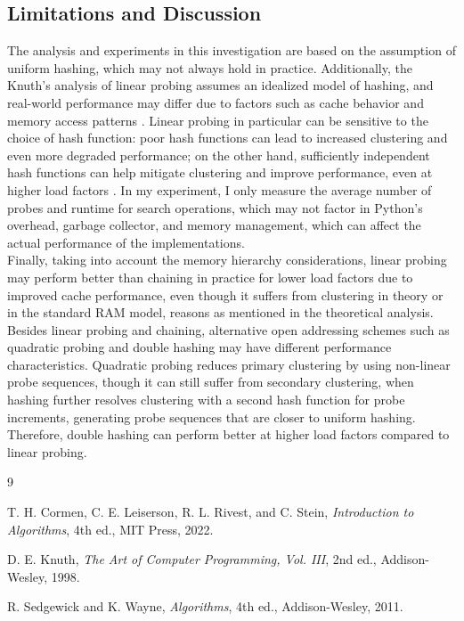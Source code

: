 \documentclass[12pt, a4paper]{article}
\begin{document}
\subsection*{Limitations and Discussion}
The analysis and experiments in this investigation are based on the assumption of uniform hashing, which may not always hold in practice.
Additionally, the Knuth's analysis of linear probing assumes an idealized model of hashing, and real-world performance may differ due to factors such as cache behavior and memory access patterns \cite{clrs}. 
Linear probing in particular can be sensitive to the choice of hash function: poor hash functions can lead to increased clustering and even more degraded performance; on the other hand,
sufficiently independent hash functions can help mitigate clustering and improve performance, even at higher load factors \cite{clrs}.
In my experiment, I only measure the average number of probes and runtime for search operations, which may not factor in Python's overhead, garbage collector, and memory management, 
which can affect the actual performance of the implementations.\\
Finally, taking into account the memory hierarchy considerations, linear probing may perform better than chaining in practice for lower load factors due to improved cache performance, even though it 
suffers from clustering in theory or in the standard RAM model, reasons as mentioned in the theoretical analysis.\\
\newline
Besides linear probing and chaining, alternative open addressing schemes such as quadratic probing and double hashing 
may have different performance characteristics. Quadratic probing reduces primary clustering by using non-linear probe sequences, though it can 
still suffer from secondary clustering, when hashing further resolves clustering with a second hash function for probe increments, 
generating probe sequences that are closer to uniform hashing. Therefore, double hashing can perform better at higher 
load factors compared to linear probing.

\begin{thebibliography}{9}

T. H. Cormen, C. E. Leiserson, R. L. Rivest, and C. Stein,
\textit{Introduction to Algorithms},
4th ed., MIT Press, 2022.

D. E. Knuth,
\textit{The Art of Computer Programming, Vol. III},
2nd ed., Addison-Wesley, 1998.

R. Sedgewick and K. Wayne,
\textit{Algorithms},
4th ed., Addison-Wesley, 2011.
\end{thebibliography}
\end{document}

